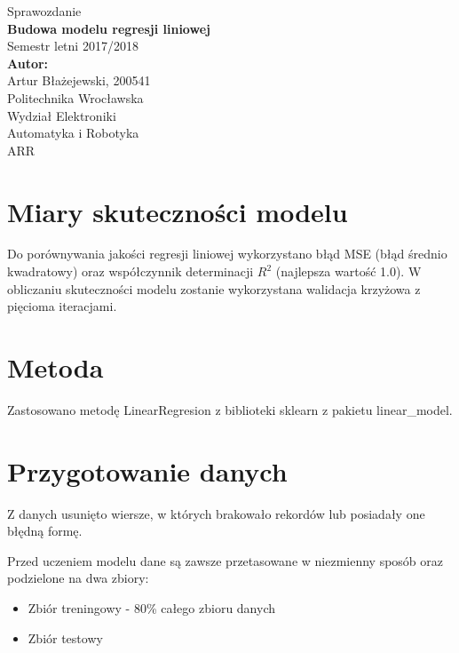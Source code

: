 \documentclass[a4paper,12pt]{article}
\begin{document}
\begin{titlepage}
\begin{center}
\vspace*{1cm}
{ \Large Sprawozdanie }\\[1cm]


{ \large \textbf{Budowa modelu regresji liniowej} }\\
Semestr letni 2017/2018\\[2cm]

\Large
\textbf{Autor:}\\
Artur Błażejewski, 200541\\


\vfill
\Large
Politechnika Wrocławska\\
\large
Wydział Elektroniki\\
Automatyka i Robotyka\\
ARR
\end{center}
\end{titlepage}

\section{Miary skuteczności modelu}
	Do porównywania jakości regresji liniowej wykorzystano błąd MSE (błąd średnio kwadratowy) oraz współczynnik determinacji $R^2$ (najlepsza wartość 1.0). W obliczaniu skuteczności modelu zostanie wykorzystana walidacja krzyżowa z pięcioma iteracjami.

\section{Metoda}
	Zastosowano metodę LinearRegresion z biblioteki sklearn z pakietu linear\_model.

\section{Przygotowanie danych}
	Z danych usunięto wiersze, w których brakowało rekordów lub posiadały one błędną formę.
	
	Przed uczeniem modelu dane są zawsze przetasowane w niezmienny sposób oraz podzielone na dwa zbiory:
	\begin{itemize}
		\item Zbiór treningowy - 80\% całego zbioru danych
		\item Zbiór testowy
	\end{itemize}
	
\end{document}
